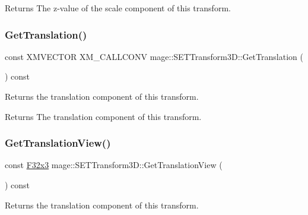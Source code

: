 \begin{DoxyReturn}{Returns}
The z-\/value of the scale component of this transform. 
\end{DoxyReturn}
\mbox{\label{classmage_1_1_s_e_t_transform3_d_ae2d7793e50077bde1d9519d15c19ebd7}} 
\subsubsection{\texorpdfstring{Get\+Translation()}{GetTranslation()}}
{\footnotesize\ttfamily const X\+M\+V\+E\+C\+T\+OR X\+M\+\_\+\+C\+A\+L\+L\+C\+O\+NV mage\+::\+S\+E\+T\+Transform3\+D\+::\+Get\+Translation (\begin{DoxyParamCaption}{ }\end{DoxyParamCaption}) const\hspace{0.3cm}{\ttfamily [noexcept]}}

Returns the translation component of this transform.

\begin{DoxyReturn}{Returns}
The translation component of this transform. 
\end{DoxyReturn}
\mbox{\label{classmage_1_1_s_e_t_transform3_d_af7452f8367721a779a39fb878a5295af}} 
\subsubsection{\texorpdfstring{Get\+Translation\+View()}{GetTranslationView()}}
{\footnotesize\ttfamily const \mbox{\hyperlink{namespacemage_a1e3c7a882af461f161caa1cbddaf1fa2}{F32x3}} mage\+::\+S\+E\+T\+Transform3\+D\+::\+Get\+Translation\+View (\begin{DoxyParamCaption}{ }\end{DoxyParamCaption}) const\hspace{0.3cm}{\ttfamily [noexcept]}}

Returns the translation component of this transform.

